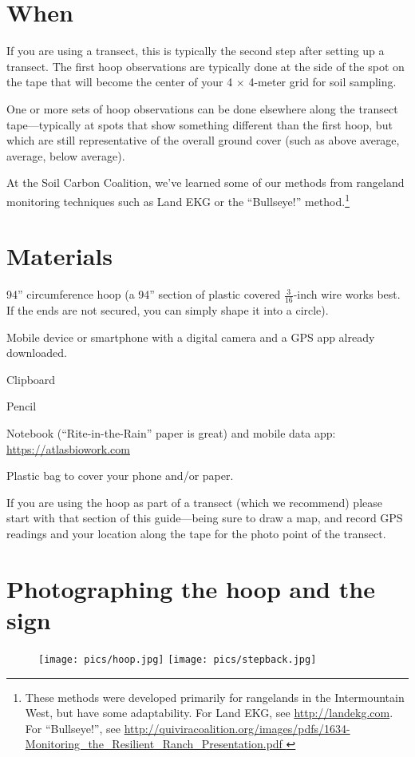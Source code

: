 \documentclass[11pt,letterpaper,twoside,onecolumn]{memoir}
\begin{document}
\section*{When}
If you are using a transect, this is typically the second step after setting up a transect. The first hoop observations are typically done at the side of the spot on the tape that will become the center of your 4 $\times$ 4-meter grid for soil sampling.

One or more sets of hoop observations can be done elsewhere along the transect tape---typically at spots that show something different than the first hoop, but which are still representative of the overall ground cover (such as above average, average, below average).

At the Soil Carbon Coalition, we've learned some of our methods from rangeland monitoring techniques such as Land EKG  or the ``Bullseye!'' method.\footnote{These methods were developed primarily for rangelands in the Intermountain West, but have some adaptability. For Land EKG, see \url{http://landekg.com}. For ``Bullseye!'', see \url{ http://quiviracoalition.org/images/pdfs/1634-Monitoring_the_Resilient_Ranch_Presentation.pdf }}


\section*{Materials}
\begin{checkboxlist}
\item 94'' circumference hoop (a 94'' section of plastic covered $\frac{3}{16}$-inch wire works best. If the ends are not secured, you can simply shape it into a circle).
\item Mobile device or smartphone with a digital camera and a GPS app already downloaded.
\item Clipboard
\item Pencil
\item Notebook (``Rite-in-the-Rain'' paper is great) and mobile data app: \url{https://atlasbiowork.com}
\item Plastic bag to cover your phone and/or paper.
\end{checkboxlist}

If you are using the hoop as part of a transect (which we recommend) please start with that section of this guide---being sure to draw a map, and record GPS readings and your location along the tape for the photo point of the transect. 
\section*{Photographing the hoop and the sign}
\begin{figure}

\texttt{[image: pics/hoop.jpg]}
\hfill
\texttt{[image: pics/stepback.jpg]}
\end{figure}
\end{document}
